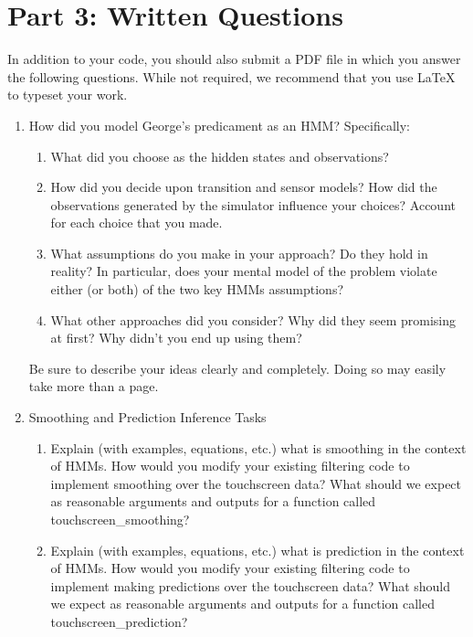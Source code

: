 \documentclass{article}
\begin{document}
\section{Part 3: Written Questions}
In addition to your code, you should also submit a PDF file in which you
answer the following questions.
While not required, we recommend that you use \LaTeX{} to typeset your work.

\begin{enumerate}
\item How did you model George's predicament as an HMM?
  Specifically:

\begin{enumerate}  
\item What did you choose as the hidden states and observations?
  
\item How did you decide upon transition and sensor models?
  How did the observations generated by the simulator influence your choices?
  Account for each choice that you made.

\item What assumptions do you make in your approach? Do they hold in reality?
  In particular, does your mental model of the problem violate either (or both) of the two key HMMs assumptions?

\item What other approaches did you consider? Why did they seem promising at first? Why didn’t you end up using them?
\end{enumerate}

Be sure to describe your ideas clearly and completely.
Doing so may easily take more than a page.

\item Smoothing and Prediction Inference Tasks
\begin{enumerate}
  \item Explain (with examples, equations, etc.) what is smoothing in the context of HMMs. How would you modify your existing filtering code to implement smoothing over the touchscreen data? What should we expect as reasonable arguments and outputs for a function called touchscreen\_smoothing?

  \item Explain (with examples, equations, etc.) what is prediction in the context of HMMs. How would you modify your existing filtering code to implement making predictions over the touchscreen data? What should we expect as reasonable arguments and outputs for a function called touchscreen\_prediction?
\end{enumerate}
\fi

\end{enumerate}
\end{document}
